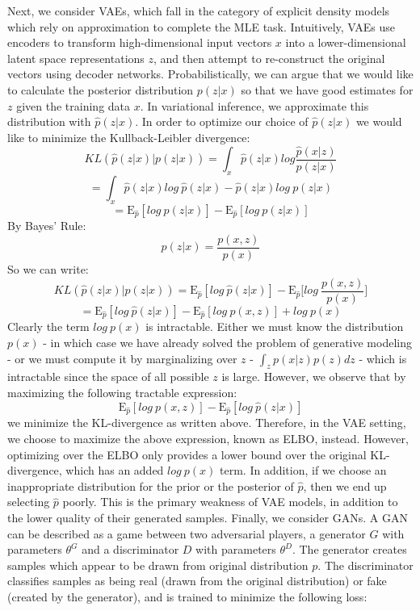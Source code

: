 \documentclass[a4paper]{article}
\begin{document}
\begin{enumerate}
{Next, we consider VAEs, which fall in the category of explicit density models which rely on approximation to complete the MLE task. Intuitively, VAEs use encoders to transform high-dimensional input vectors $x$ into a lower-dimensional latent space representations $z$, and then attempt to re-construct the original vectors using decoder networks. Probabilistically, we can argue that we would like to calculate the posterior distribution $p \left(z|x \right) $ so that we have good estimates for $z$ given the training data $x$. In variational inference, we approximate this distribution with $\hat{p} \left( z|x \right)$. In order to optimize our choice of $ \hat{p} \left(z|x \right)$ we would like to minimize the Kullback-Leibler divergence:
$$KL\left( \hat{p} \left(z|x \right) |  p \left( z|x \right) \right)  = \int_{x} \hat{p}(z|x) log \frac{\hat{p}(x|z) }{p(z|x ) } $$
$$ = \int_{x} \hat{p}(z| x) log \ \hat{p}(z |x)  - \hat{p}(z| x) log \ p(z|x )  $$
$$ = \mathrm{E}_{\hat{p}} [ log \  \hat{p}(z |x) ] - \mathrm{E}_{\hat{p}} [ log \ p (z | x) ]  $$
By Bayes' Rule:
$$ p (z|x) = \frac{p(x,z)}{p(x)}$$
So we can write:
$$KL\left( \hat{p} \left(z|x \right) |  p \left( z|x \right) \right) = \mathrm{E}_{\hat{p}} [ log \  \hat{p}(z |x) ] - \mathrm{E}_{\hat{p}} \Big[ log \ \frac{p(x,z)}{p(x)} \Big] $$
$$ =   \mathrm{E}_{\hat{p}} [ log\  \hat{p}(z |x) ] - \mathrm{E}_{\hat{p}} [ log \ p(x,z) ] + log \ p(x)$$
Clearly the term $log \ p(x)$ is intractable. Either we must know the distribution $p(x)$ - in which case we have already solved the problem of generative modeling - or we must compute it by marginalizing over $z$ - $\int_z p(x|z) p(z) dz$ - which is intractable since the space of all possible $z$ is large. However, we observe that by maximizing the following tractable expression:
$$\mathrm{E}_{\hat{p}} [ log \ p(x,z) ] - \mathrm{E}_{\hat{p}} [ log\  \hat{p}(z |x) ] $$
we minimize the KL-divergence as written above. Therefore, in the VAE setting, we choose to maximize the above expression, known as ELBO, instead. However, optimizing over the ELBO only provides a lower bound over the original KL-divergence, which has an added $log \ p(x)$ term. In addition, if we choose an inappropriate distribution for the prior or the posterior of $\hat{p}$, then we end up selecting $\hat{p}$ poorly. This is the primary weakness of VAE models, in addition to the lower quality of their generated samples.
\newline
\newline
Finally, we consider GANs. A GAN can be described as a game between two adversarial players, a generator $G$ with parameters $\theta^G$ and a discriminator $D$ with parameters $\theta^D$. The generator creates samples which appear to be drawn from original distribution $p$. The discriminator classifies samples as being real (drawn from the original distribution) or fake (created by the generator), and is trained to minimize the following loss:
}
\end{enumerate}
\end{document}
